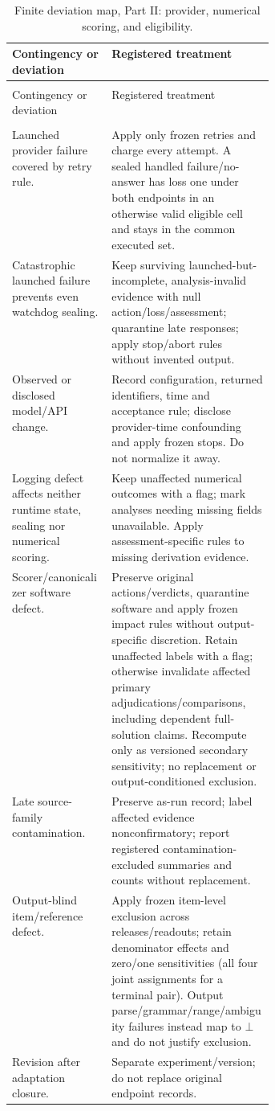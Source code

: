\documentclass[10pt]{article} %
\providecommand{\1}{\mathbf{1}}  %
\theoremstyle{remark}
\theoremstyle{definition}
\begin{document}
\begingroup
\footnotesize
\renewcommand{\arraystretch}{1.13}
\setlength{\LTpre}{6pt}
\setlength{\LTpost}{8pt}
\setlength{\LTcapwidth}{\linewidth}
\begin{longtable}{@{}>{\raggedright\arraybackslash}p{0.38\linewidth}>{\raggedright\arraybackslash}p{}@{}}
\caption{Finite deviation map, Part II: provider, numerical scoring, and eligibility.}\label{tab:prospective-deviation-map-b}\\
\toprule
Contingency or deviation & Registered treatment \\
\midrule
\endfirsthead
\multicolumn{2}{@{}l}{\textit{Table \thetable\ continued}}\\
\toprule
Contingency or deviation & Registered treatment \\
\midrule
\endhead
\midrule
\multicolumn{2}{r@{}}{\textit{Continued on next page}}\\
\endfoot
\bottomrule
\endlastfoot

Launched provider failure covered by retry rule. & Apply only frozen retries and charge every attempt. A sealed handled failure/no-answer has loss one under both endpoints in an otherwise valid eligible cell and stays in the common executed set. \\
Catastrophic launched failure prevents even watchdog sealing. & Keep surviving launched-but-incomplete, analysis-invalid evidence with null action/loss/assessment; quarantine late responses; apply stop/abort rules without invented output. \\
Observed or disclosed model/API change. & Record configuration, returned identifiers, time and acceptance rule; disclose provider-time confounding and apply frozen stops. Do not normalize it away. \\
Logging defect affects neither runtime state, sealing nor numerical scoring. & Keep unaffected numerical outcomes with a flag; mark analyses needing missing fields unavailable. Apply assessment-specific rules to missing derivation evidence. \\
Scorer/canonicalizer software defect. & Preserve original actions/verdicts, quarantine software and apply frozen impact rules without output-specific discretion. Retain unaffected labels with a flag; otherwise invalidate affected primary adjudications/comparisons, including dependent full-solution claims. Recompute only as versioned secondary sensitivity; no replacement or output-conditioned exclusion. \\
Late source-family contamination. & Preserve as-run record; label affected evidence nonconfirmatory; report registered contamination-excluded summaries and counts without replacement. \\
Output-blind item/reference defect. & Apply frozen item-level exclusion across releases/readouts; retain denominator effects and zero/one sensitivities (all four joint assignments for a terminal pair). Output parse/grammar/range/ambiguity failures instead map to $\bot$ and do not justify exclusion. \\
Revision after adaptation closure. & Separate experiment/version; do not replace original endpoint records. \\
\end{longtable}
\endgroup
\end{document}
